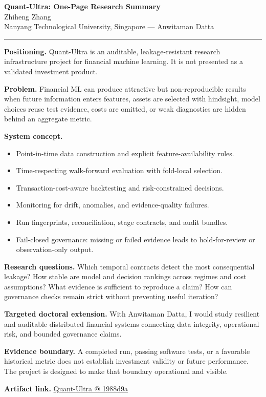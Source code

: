 \documentclass[11pt]{article}
\makeatletter
\newcommand{\ApplicantName}{Zhiheng Zhang}
\newcommand{\ApplicantGitHub}{\href{https://github.com/zhiheng-zhang-Mera/Quant-Ultra/tree/1988d9a8530da91a8158de864d098ea869098923}{Quant-Ultra @ 1988d9a}}
\makeatother
\begin{document}
\begin{center}
{\LARGE\bfseries Quant-Ultra: One-Page Research Summary}\\[0.25em]
{\large \ApplicantName}\\
Nanyang Technological University, Singapore --- Anwitaman Datta
\end{center}
\vspace{0.35em}\hrule\vspace{0.65em}

\textbf{Positioning.} Quant-Ultra is an auditable, leakage-resistant research infrastructure project for financial machine learning. It is not presented as a validated investment product.

\textbf{Problem.} Financial ML can produce attractive but non-reproducible results when future information enters features, assets are selected with hindsight, model choices reuse test evidence, costs are omitted, or weak diagnostics are hidden behind an aggregate metric.

\textbf{System concept.}
\begin{itemize}
\item Point-in-time data construction and explicit feature-availability rules.
\item Time-respecting walk-forward evaluation with fold-local selection.
\item Transaction-cost-aware backtesting and risk-constrained decisions.
\item Monitoring for drift, anomalies, and evidence-quality failures.
\item Run fingerprints, reconciliation, stage contracts, and audit bundles.
\item Fail-closed governance: missing or failed evidence leads to hold-for-review or observation-only output.
\end{itemize}

\textbf{Research questions.} Which temporal contracts detect the most consequential leakage? How stable are model and decision rankings across regimes and cost assumptions? What evidence is sufficient to reproduce a claim? How can governance checks remain strict without preventing useful iteration?

\textbf{Targeted doctoral extension.} With Anwitaman Datta, I would study resilient and auditable distributed financial systems connecting data integrity, operational risk, and bounded governance claims.

\textbf{Evidence boundary.} A completed run, passing software tests, or a favorable historical metric does not establish investment validity or future performance. The project is designed to make that boundary operational and visible.

\textbf{Artifact link.} \ApplicantGitHub
\end{document}
